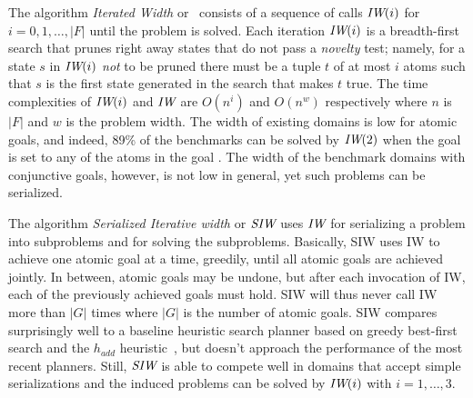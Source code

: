 
The algorithm  \emph{Iterated Width}  or \IR\ 
consists  of a sequence of calls ${\textit{IW}}(i)$ for $i=0,1,\ldots, |F|$
until the problem is solved. Each iteration ${\textit{IW}}(i)$ is a 
breadth-first search that prunes right away  states  that do not pass a   \emph{novelty} test; 
namely, for a state $s$ in ${\textit{IW}}(i)$ \emph{not} to be pruned there must be 
a tuple $t$ of at most $i$ atoms such that $s$ is the first state 
generated in the search that makes $t$ true. The time complexities of ${\textit{IW}}(i)$ and ${\textit{IW}}$
are  $O(n^i)$ and $O(n^w)$ respectively  where $n$ is $|F|$ and $w$ is the problem width.
The width of existing domains is low for atomic goals,  and indeed,  89\% of the  benchmarks
can be solved by ${\textit{IW}}(2)$ when the goal is set to any  of the atoms in the goal \cite{nir:ecai12}.
The width of the benchmark domains with conjunctive goals, however, is not low in general,
yet such problems can be serialized.


The algorithm \emph{Serialized Iterative width} or ${\textit{SIW}}$ uses ${\textit{IW}}$
for serializing a problem into subproblems and for solving the
subproblems.  Basically, SIW uses IW to achieve one atomic goal at a
time, greedily, until all atomic goals are achieved jointly. In
between, atomic goals may be undone, but after each invocation of IW,
each of the previously achieved goals must hold. SIW will thus never
call IW more than $|G|$ times where $|G|$ is the number of atomic
goals. SIW compares surprisingly well to a baseline heuristic search
planner based on greedy best-first search and the $h_{add}$
heuristic~\cite{bonet:aij-hsp}, but doesn't approach the performance
of the most recent planners. Still, ${\textit{SIW}}$ is able to compete well in
domains that accept simple serializations and the induced problems can
be solved by ${\textit{IW}}(i)$ with $i=1,\ldots,3$.
